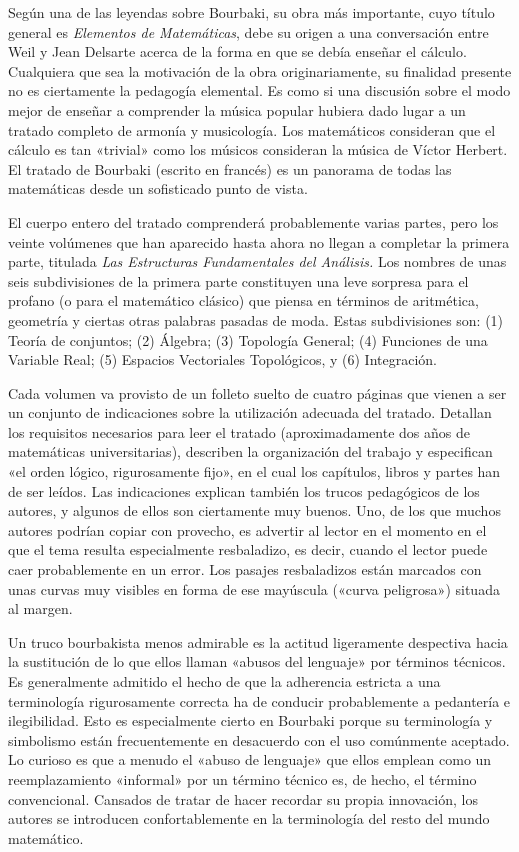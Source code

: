 \documentclass[a4paper, 12pt]{article}
\begin{document}
Según una de las leyendas sobre Bourbaki, su obra más 
importante, cuyo título general es {\it Elementos de Matemáticas}, debe 
su origen a una conversación entre Weil y Jean Delsarte acerca de la 
forma en que se debía enseñar el cálculo. Cualquiera que sea la 
motivación de la obra originariamente, su finalidad presente no es 
ciertamente la pedagogía elemental. Es como si una discusión sobre 
el modo mejor de enseñar a comprender la música popular hubiera dado 
lugar a un tratado completo de armonía y musicología. Los 
matemáticos consideran que el cálculo es tan «trivial» como los 
músicos consideran la música de Víctor Herbert. El tratado de 
Bourbaki (escrito en francés) es un panorama de todas las 
matemáticas desde un sofisticado punto de vista. 

El cuerpo entero del tratado comprenderá probablemente varias 
partes, pero los veinte volúmenes que han aparecido hasta ahora no 
llegan a completar la primera parte, titulada {\it Las Estructuras Fundamentales 
del Análisis.} Los nombres de unas seis subdivisiones de la primera parte 
constituyen una leve sorpresa para el profano (o para el matemático 
clásico) que piensa en términos de aritmética, geometría y 
ciertas otras palabras pasadas de moda. Estas subdivisiones son: (1) 
Teoría de conjuntos; (2) Álgebra; (3) Topología General; (4) 
Funciones de una Variable Real; (5) Espacios Vectoriales Topológicos, y 
(6) Integración. 

Cada volumen va provisto de un folleto suelto de cuatro páginas que 
vienen a ser un conjunto de indicaciones sobre la utilización adecuada 
del tratado. Detallan los requisitos necesarios para leer el tratado 
(aproximadamente dos años de matemáticas universitarias), describen 
la organización del trabajo y especifican «el orden lógico, 
rigurosamente fijo», en el cual los capítulos, libros y partes han de 
ser leídos. Las indicaciones explican también los trucos 
pedagógicos de los autores, y algunos de ellos son ciertamente muy 
buenos. Uno, de los que muchos autores podrían copiar con provecho, es 
advertir al lector en el momento en el que el tema resulta especialmente 
resbaladizo, es decir, cuando el lector puede caer probablemente en un 
error. Los pasajes resbaladizos están marcados con unas curvas muy 
visibles en forma de ese mayúscula («curva peligrosa») situada al 
margen. 

Un truco bourbakista menos admirable es la actitud ligeramente 
despectiva hacia la sustitución de lo que ellos llaman «abusos del 
lenguaje» por términos técnicos. Es generalmente admitido el hecho 
de que la adherencia estricta a una terminología rigurosamente correcta 
ha de conducir probablemente a pedantería e ilegibilidad. Esto es 
especialmente cierto en Bourbaki porque su terminología y simbolismo 
están frecuentemente en desacuerdo con el uso comúnmente aceptado. 
Lo curioso es que a menudo el «abuso de lenguaje» que ellos emplean como 
un reemplazamiento «informal» por un término técnico es, de hecho, 
el término convencional. Cansados de tratar de hacer recordar su propia 
innovación, los autores se introducen confortablemente en la 
terminología del resto del mundo matemático. 
\end{document}

